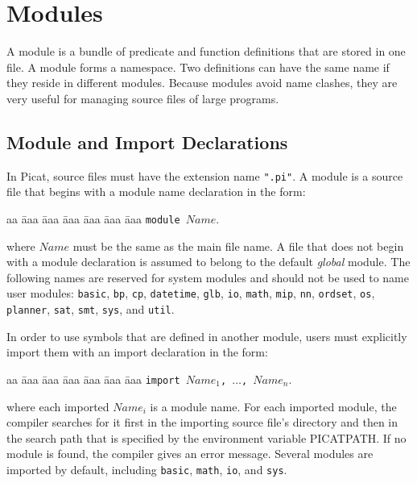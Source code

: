 \chapter{Modules}
A module is a bundle of predicate and function definitions that are stored in one file. A module forms a namespace.  Two definitions can have the same name if they reside in different modules. Because modules avoid name clashes, they are very useful for managing source files of large programs.

\section{Module and Import Declarations}
In Picat, source files must have the extension name \texttt{".pi"}.  A module is a source file that begins with a module name declaration in the form:
\begin{tabbing}
aa \= aaa \= aaa \= aaa \= aaa \= aaa \= aaa \kill
\> \texttt{module $Name$}.
\end{tabbing}
where $Name$ must be the same as the main file name. A file that does not begin with a module declaration is assumed to belong to the default \emph{global} module. The following names are reserved for system modules and should not be used to name user modules: \texttt{basic}, \texttt{bp}, \texttt{cp}, \texttt{datetime}, \texttt{glb},  \texttt{io}, \texttt{math}, \texttt{mip}, \texttt{nn}, \texttt{ordset}, \texttt{os}, \texttt{planner}, \texttt{sat}, \texttt{smt}, \texttt{sys},  and \texttt{util}.

In order to use symbols that are defined in another module, users must explicitly import them with an import declaration in the form:
\begin{tabbing}
aa \= aaa \= aaa \= aaa \= aaa \= aaa \= aaa \kill
\> \texttt{import $Name_1$, $\ldots$, $Name_n$}.
\end{tabbing}
where each imported $Name_i$ is a module name. For each imported module, the compiler searches for it first in the importing source file’s directory and then in the search path that is specified by the environment variable PICATPATH. If no module is found, the compiler gives an error message. Several modules are imported by default, including  \texttt{basic}, \texttt{math}, \texttt{io},  and \texttt{sys}.

